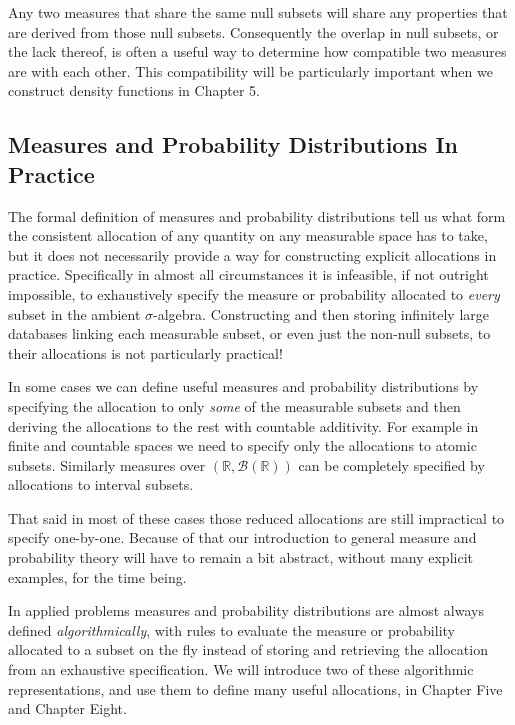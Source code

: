 \documentclass[
  letterpaper,
  DIV=11,
  numbers=noendperiod]{scrartcl}
\begin{document}
Any two measures that share the same null subsets will share any
properties that are derived from those null subsets. Consequently the
overlap in null subsets, or the lack thereof, is often a useful way to
determine how compatible two measures are with each other. This
compatibility will be particularly important when we construct density
functions in Chapter 5.

\hypertarget{measures-and-probability-distributions-in-practice}{%
\subsection{Measures and Probability Distributions In
Practice}\label{measures-and-probability-distributions-in-practice}}

The formal definition of measures and probability distributions tell us
what form the consistent allocation of any quantity on any measurable
space has to take, but it does not necessarily provide a way for
constructing explicit allocations in practice. Specifically in almost
all circumstances it is infeasible, if not outright impossible, to
exhaustively specify the measure or probability allocated to
\emph{every} subset in the ambient \(\sigma\)-algebra. Constructing and
then storing infinitely large databases linking each measurable subset,
or even just the non-null subsets, to their allocations is not
particularly practical!

In some cases we can define useful measures and probability
distributions by specifying the allocation to only \emph{some} of the
measurable subsets and then deriving the allocations to the rest with
countable additivity. For example in finite and countable spaces we need
to specify only the allocations to atomic subsets. Similarly measures
over \((\mathbb{R}, \mathcal{B}(\mathbb{R}))\) can be completely
specified by allocations to interval subsets.

That said in most of these cases those reduced allocations are still
impractical to specify one-by-one. Because of that our introduction to
general measure and probability theory will have to remain a bit
abstract, without many explicit examples, for the time being.

In applied problems measures and probability distributions are almost
always defined \emph{algorithmically}, with rules to evaluate the
measure or probability allocated to a subset on the fly instead of
storing and retrieving the allocation from an exhaustive specification.
We will introduce two of these algorithmic representations, and use them
to define many useful allocations, in Chapter Five and Chapter Eight.
\end{document}
